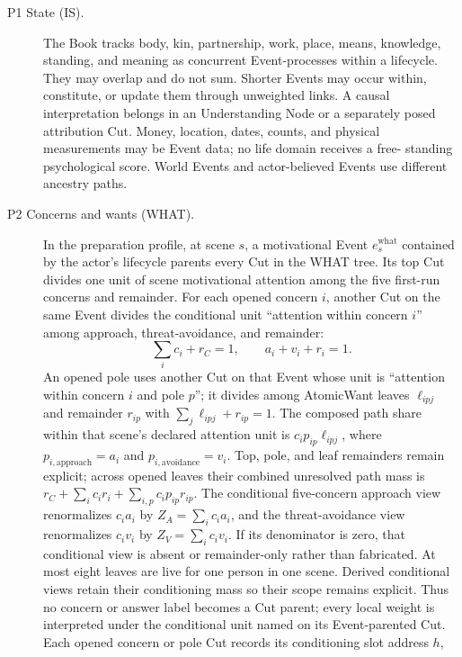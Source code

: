 \documentclass[11pt,a4paper]{article}
\begin{document}
\begin{description}
  \item[P1 State (IS).] The Book tracks body, kin, partnership,
    work, place, means, knowledge, standing, and meaning as concurrent
    Event-processes within a lifecycle. They may overlap and do not sum.
    Shorter Events may occur within, constitute, or update them through
    unweighted links. A causal interpretation belongs in an Understanding Node
    or a separately posed attribution Cut. Money, location, dates, counts, and
    physical measurements may be Event data; no life domain receives a free-
    standing psychological score. World Events and actor-believed Events use
    different ancestry paths.
  \item[P2 Concerns and wants (WHAT).] In the preparation profile, at scene $s$, a motivational Event
    $e_{s}^{\mathrm{what}}$ contained by the actor's lifecycle parents every Cut in the WHAT tree. Its top
    Cut divides one unit of scene motivational attention among the five
    first-run concerns and remainder. For each opened concern $i$, another Cut
    on the same Event divides the conditional unit ``attention within concern
    $i$'' among approach, threat-avoidance, and remainder:
    \begin{equation}
      \sum_i c_i+r_C=1,\qquad a_i+v_i+r_i=1.
    \end{equation}
    An opened pole uses another Cut on that Event whose unit is ``attention
    within concern $i$ and pole $p$''; it divides among AtomicWant leaves
    $\ell_{ipj}$ and remainder $r_{ip}$ with
    $\sum_j\ell_{ipj}+r_{ip}=1$. The composed path share within
    that scene's declared attention unit is $c_i p_{ip}\ell_{ipj}$, where
    $p_{i,\mathrm{approach}}=a_i$ and
    $p_{i,\mathrm{avoidance}}=v_i$. Top, pole, and leaf remainders remain
    explicit; across opened leaves their combined unresolved path mass is
    $r_C+\sum_i c_i r_i+\sum_{i,p}c_i p_{ip}r_{ip}$. The conditional
    five-concern approach view renormalizes $c_i a_i$ by
    $Z_A=\sum_i c_i a_i$, and the threat-avoidance view renormalizes $c_i v_i$
    by $Z_V=\sum_i c_i v_i$. If its denominator is zero, that conditional view
    is absent or remainder-only rather than fabricated. At most eight leaves
    are live for one person in one scene. Derived conditional views retain
    their conditioning mass so their scope remains explicit.
    Thus no concern or answer label becomes a Cut parent; every local weight is
    interpreted under the conditional unit named on its Event-parented Cut.
    Each opened concern or pole Cut records its conditioning slot address $h$,

\end{description}
\end{document}
